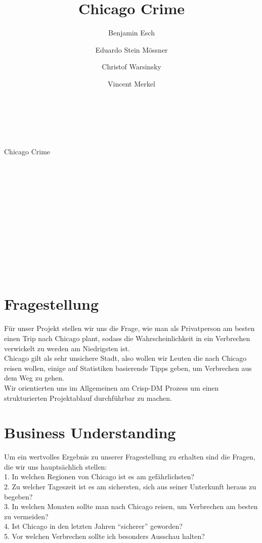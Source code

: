 \documentclass[10pt]{article}
\title{Chicago Crime}
\begin{document}
    {
    \Huge{
    \centering
\ \\
\ \\
\ \\
Chicago Crime\\
\ \\
\ \\
\ \\
\ \\
\ \\
    }
    }
    
    {\huge
    {\centering
    \author[1]{ Benjamin Esch}\\
    \author[2]{ Eduardo Stein Mössner}\\
    \author[3]{ Christof Warsinsky}\\
    \author[4]{ Vincent Merkel}\\
    }
    }
    \newpage
    \tableofcontents
    \newpage
    

    
    \section{Fragestellung}\label{fragestellung}

    Für unser Projekt stellen wir uns die Frage, wie man als Privatperson am
besten einen Trip nach Chicago plant, sodass die Wahrscheinlichkeit in
ein Verbrechen verwickelt zu werden am Niedrigsten ist.\\
Chicago gilt als sehr unsichere Stadt, also wollen wir Leuten die nach
Chicago reisen wollen, einige auf Statistiken basierende Tipps geben, um Verbrechen aus dem Weg zu gehen.\\
Wir orientierten uns im Allgemeinen am Crisp-DM Prozess um einen
strukturierten Projektablauf durchführbar zu machen.

    \section{Business Understanding}\label{business-understanding}

    Um ein wertvolles Ergebnis zu unserer Fragestellung zu erhalten sind die
Fragen, die wir uns hauptsächlich stellen:\\
1. In welchen Regionen von Chicago ist es am gefährlichsten?\\
2. Zu welcher Tageszeit ist es am sichersten, sich aus seiner Unterkunft
heraus zu begeben?\\
3. In welchen Monaten sollte man nach Chicago reisen, um Verbrechen am
besten zu vermeiden?\\
4. Ist Chicago in den letzten Jahren ``sicherer'' geworden?\\
5. Vor welchen Verbrechen sollte ich besonders Ausschau halten?\\
\end{document}
